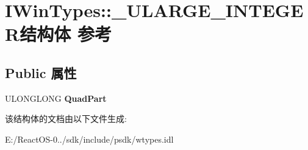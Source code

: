 \hypertarget{struct_i_win_types_1_1___u_l_a_r_g_e___i_n_t_e_g_e_r}{}\section{I\+Win\+Types\+:\+:\+\_\+\+U\+L\+A\+R\+G\+E\+\_\+\+I\+N\+T\+E\+G\+E\+R结构体 参考}
\label{struct_i_win_types_1_1___u_l_a_r_g_e___i_n_t_e_g_e_r}
\subsection*{Public 属性}
\begin{DoxyCompactItemize}
\item 
\mbox{\label{struct_i_win_types_1_1___u_l_a_r_g_e___i_n_t_e_g_e_r_a5043b35aee7acf0b1070764ead0ed342}} 
U\+L\+O\+N\+G\+L\+O\+NG {\bfseries Quad\+Part}
\end{DoxyCompactItemize}


该结构体的文档由以下文件生成\+:\begin{DoxyCompactItemize}
\item 
E\+:/\+React\+O\+S-\/0../sdk/include/psdk/wtypes.\+idl\end{DoxyCompactItemize}
